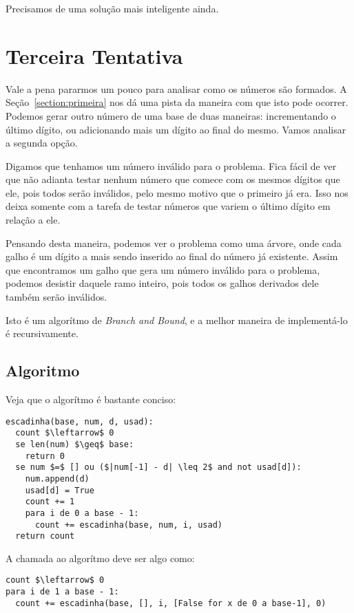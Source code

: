 \documentclass[12pt]{article}
\begin{document}
Precisamos de uma solução mais inteligente ainda.

\section{Terceira Tentativa}\label{section:terceira}
Vale a pena pararmos um pouco para analisar como os números são formados. A Seção~\ref{section:primeira} nos dá uma pista da maneira com que isto pode ocorrer. Podemos gerar outro número de uma base de duas maneiras: incrementando o último dígito, ou adicionando mais um dígito ao final do mesmo. Vamos analisar a segunda opção.

Digamos que tenhamos um número inválido para o problema. Fica fácil de ver que não adianta testar nenhum número que comece com os mesmos dígitos que ele, pois todos serão inválidos, pelo mesmo motivo que o primeiro já era. Isso nos deixa somente com a tarefa de testar números que variem o último dígito em relação a ele.

Pensando desta maneira, podemos ver o problema como uma árvore, onde cada galho é um dígito a mais sendo inserido ao final do número já existente. Assim que encontramos um galho que gera um número inválido para o problema, podemos desistir daquele ramo inteiro, pois todos os galhos derivados dele também serão inválidos.

Isto é um algorítmo de {\em Branch and Bound}, e a melhor maneira de implementá-lo é recursivamente.

\subsection{Algoritmo}\label{section:terceira:algoritmo}
Veja que o algorítmo é bastante conciso:

\begin{lstlisting}
escadinha(base, num, d, usad):
  count $\leftarrow$ 0
  se len(num) $\geq$ base:
    return 0
  se num $=$ [] ou ($|num[-1] - d| \leq 2$ and not usad[d]):
    num.append(d)
    usad[d] = True
    count += 1
    para i de 0 a base - 1:
      count += escadinha(base, num, i, usad)
  return count
\end{lstlisting}

A chamada ao algorítmo deve ser algo como:
\begin{lstlisting}
count $\leftarrow$ 0
para i de 1 a base - 1:
  count += escadinha(base, [], i, [False for x de 0 a base-1], 0)
\end{lstlisting}
\end{document}
